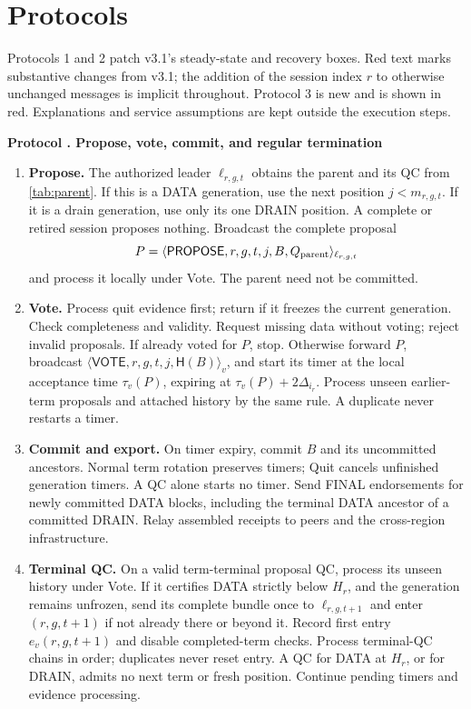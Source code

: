 \documentclass[11pt,a4paper]{article}
\newcommand{\RR}[1]{{\color{rrRed}#1}}
\newcommand{\Hash}{\mathsf H}
\newcommand{\tagg}[1]{\ensuremath{\mathsf{#1}}}
\newcounter{protocol}
\newenvironment{protocol}[2]{\refstepcounter{protocol}\label{#1}
\begin{mdframed}[nobreak=true,linewidth=.6pt,skipabove=8pt,skipbelow=8pt,
innertopmargin=7pt,innerbottommargin=7pt]\small
\textbf{Protocol \theprotocol. #2}\par\smallskip}{\end{mdframed}}
\begin{document}
\section{Protocols}
\label{sec:protocols}
Protocols 1 and 2 patch v3.1's steady-state and recovery boxes. Red text
marks substantive changes from v3.1; the addition of the session index
$r$ to otherwise unchanged messages is implicit throughout. Protocol 3
is new and is shown in red. Explanations and service assumptions are
kept outside the execution steps.

\begin{protocol}{alg:steady}{Propose, vote, commit, and regular termination}
\begin{enumerate}[label=\textbf{\arabic*)},itemsep=5pt]
\item \textbf{Propose.} The authorized leader $\ell_{r,g,t}$ obtains the
parent and its QC from \cref{tab:parent}. \RR{If this is a DATA generation,
use the next position $j<m_{r,g,t}$. If it is a drain generation, use only
its one DRAIN position. A complete or retired session proposes nothing.}
Broadcast the complete proposal
\[
 P=\langle\tagg{PROPOSE},r,g,t,j,B,Q_{\rm parent}\rangle_{\ell_{r,g,t}}
\]
and process it locally under Vote. The parent need not be committed.

\item \textbf{Vote.} Process quit evidence first; return if it freezes
the current generation. Check completeness and validity. Request missing
data without voting; reject invalid proposals. If already voted for $P$,
stop. Otherwise forward $P$, broadcast
\RR{$\langle\tagg{VOTE},r,g,t,j,\Hash(B)\rangle_v$}, and start its
timer at the local acceptance time $\tau_v(P)$, expiring at
\RR{$\tau_v(P)+2\Delta_{i_r}$}. Process unseen earlier-term proposals
and attached history by the same rule. A duplicate never restarts a timer.

\item \textbf{Commit and export.} On timer expiry, commit $B$ and its
uncommitted ancestors. Normal term rotation preserves timers; Quit cancels
unfinished generation timers. A QC alone starts no timer.
\RR{Send FINAL endorsements for newly committed DATA blocks, including
the terminal DATA ancestor of a committed DRAIN. Relay assembled receipts
to peers and the cross-region infrastructure.}

\item \textbf{Terminal QC.} On a valid term-terminal proposal QC, process
its unseen history under Vote. \RR{If it certifies DATA strictly below
$H_r$}, and the generation remains unfrozen, send its complete bundle
once to $\ell_{r,g,t+1}$ and enter $(r,g,t+1)$ if not already there or
beyond it. Record first entry $e_v(r,g,t+1)$ and disable completed-term
checks. Process terminal-QC chains in order; duplicates never reset entry.
\RR{A QC for DATA at $H_r$, or for DRAIN, admits no next term or fresh
position. Continue pending timers and evidence processing.}


\end{enumerate}
\end{protocol}
\end{document}
